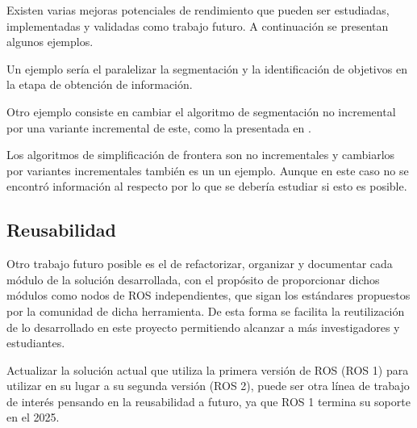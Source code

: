 
Existen varias mejoras potenciales de rendimiento que pueden ser estudiadas,
implementadas y validadas como trabajo futuro. A continuación se presentan
algunos ejemplos.

Un ejemplo sería el paralelizar la segmentación y la identificación de
objetivos en la etapa de obtención de información.

Otro ejemplo consiste en cambiar el algoritmo de segmentación no incremental por una variante
incremental de este, como la presentada en \cite{Liu2015}. 

Los algoritmos de simplificación de frontera son no incrementales y cambiarlos
por variantes incrementales también es un un ejemplo. Aunque en este caso no se
encontró información al respecto por lo que se debería estudiar si esto es
posible.



\subsection{Reusabilidad}

Otro trabajo futuro posible es el de refactorizar, organizar y documentar cada
módulo de la solución desarrollada, con el propósito de proporcionar dichos
módulos como nodos de \gls{ROS} independientes, que sigan los estándares propuestos
por la comunidad de dicha herramienta. De esta forma se facilita la
reutilización de lo desarrollado en este proyecto permitiendo
alcanzar a más investigadores y estudiantes.

Actualizar la solución actual que utiliza la primera versión de \gls{ROS} (\gls{ROS} 1)
para utilizar en su lugar a su segunda versión (\gls{ROS} 2), puede ser otra línea de
trabajo de interés pensando en la reusabilidad a futuro, ya que \gls{ROS} 1 termina
su soporte en el 2025.




